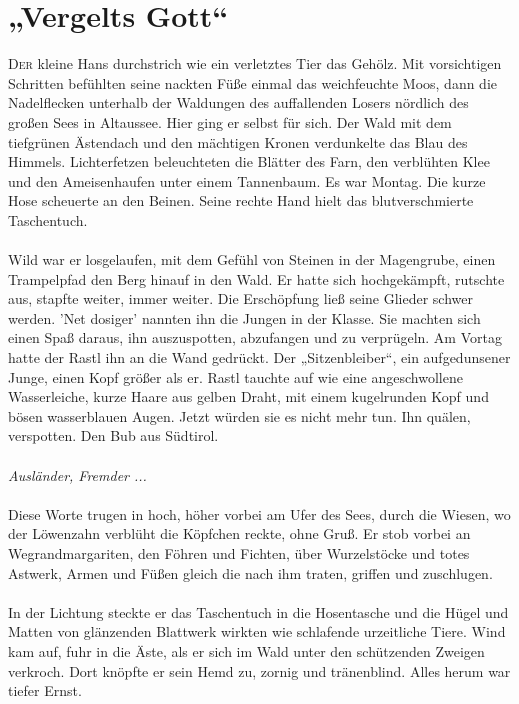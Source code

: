 \chapter{„Vergelts Gott“}
\lettrine{D}{er} kleine Hans durchstrich wie ein verletztes Tier das Gehölz. Mit vorsichtigen Schritten befühlten seine nackten Füße einmal das weichfeuchte Moos, dann die Nadelflecken unterhalb der Waldungen des auffallenden Losers nördlich des großen Sees in Altaussee. Hier ging er selbst für sich. Der Wald mit dem tiefgrünen Ästendach und den mächtigen Kronen verdunkelte das Blau des Himmels. Lichterfetzen beleuchteten die Blätter des Farn, den verblühten Klee und den Ameisenhaufen unter einem Tannenbaum. Es war Montag. Die kurze Hose scheuerte an den Beinen. Seine rechte Hand hielt das blutverschmierte Taschentuch.\\\\
Wild war er losgelaufen, mit dem Gefühl von Steinen in der Magengrube, einen Trampelpfad den Berg hinauf in den Wald. Er hatte sich hochgekämpft, rutschte aus, stapfte weiter, immer weiter. Die Erschöpfung ließ seine Glieder schwer werden. 'Net dosiger' nannten ihn die Jungen in der Klasse. Sie machten sich einen Spaß daraus, ihn auszuspotten, abzufangen und zu verprügeln. Am Vortag hatte der Rastl ihn an die Wand gedrückt. Der „Sitzenbleiber“, ein aufgedunsener Junge, einen Kopf größer als er. Rastl tauchte auf wie eine angeschwollene Wasserleiche, kurze Haare aus gelben Draht, mit einem kugelrunden Kopf und bösen wasserblauen Augen. Jetzt würden sie es nicht mehr tun. Ihn quälen, verspotten. Den Bub aus Südtirol. \\\\
\textit{Ausländer, Fremder ... }\\\\
Diese Worte trugen in hoch, höher vorbei am Ufer des Sees, durch die Wiesen, wo der Löwenzahn verblüht die Köpfchen reckte, ohne Gruß. Er stob vorbei an Wegrandmargariten, den Föhren und Fichten, über Wurzelstöcke und totes Astwerk, Armen und Füßen gleich die nach ihm traten, griffen und zuschlugen. \\\\
In der Lichtung steckte er das Taschentuch in die Hosentasche und die Hügel und Matten von glänzenden Blattwerk wirkten wie schlafende urzeitliche Tiere. Wind kam auf, fuhr in die Äste, als er sich im Wald unter den schützenden Zweigen verkroch. Dort knöpfte er sein Hemd zu, zornig und tränenblind. Alles herum war tiefer Ernst. \\
